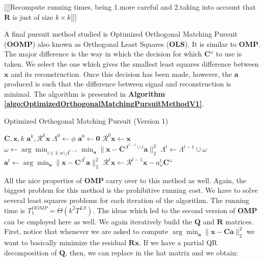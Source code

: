 \documentclass[12pt,a4paper,oneside,english]{UPBThesis}
\newcommand{\hctimes}[2]{{#1}\!\times\!{#2}}
\newcommand{\hcrange}[2]{\overline{{#1}\colon\!\!{#2}}}
\begin{document}
[[[Recompute running times, being 1.more careful and 2.taking into account that $\textbf{R}$ is just of size $\hctimes{k}{k}$]]]

A final pursuit method studied is Optimized Orthogonal Matching Pursuit (\textbf{OOMP}) also known as Orthogonal Least Squares (\textbf{OLS}). It is similar to \textbf{OMP}. The major difference is the way in which the decision for which $\textbf{C}^\omega$ to use is taken. We select the one which gives the smallest least squares difference between $\textbf{x}$ and its reconstruction. Once this decision has been made, however, the $\textbf{a}$ produced is such that the difference between signal and reconstruction is minimal. The algorithm is presented in \textbf{Algorithm \ref{algo:OptimizedOrthogonalMatchingPursuitMethodV1}}.

\begin{algorithm}
\caption{Optimized Orthogonal Matching Pursuit (Version 1)}
\label{algo:OptimizedOrthogonalMatchingPursuitMethodV1}
\begin{algorithmic}
\Require $\textbf{C},\textbf{x},k$
\Ensure $\textbf{a}^k,\mathcal{R}^k\textbf{x}$
\State $\Lambda^0 \gets \phi$
\State $\textbf{a}^0 \gets \textbf{0}$
\State $\mathcal{R}^0\textbf{x} \gets \textbf{x}$
\For {$t = \hcrange{1}{k}$}
\State $\omega \gets \arg \min_{i \in \hcrange{1}{w} \setminus \Lambda^{t-1}} \min_{\textbf{a}} {\| \textbf{x} - \textbf{C}^{\Lambda^{t-1} \cup i}\textbf{a} \|_2^2}$
\State $\Lambda^t \gets \Lambda^{t-1} \cup \omega$
\State $\textbf{a}^t \gets \arg\min_{\textbf{a}} {\| \textbf{x} - \textbf{C}^{\Lambda^t}\textbf{a} \|_2^2}$
\State $\mathcal{R}^t\textbf{x} \gets \mathcal{R}^{t-1}\textbf{x} - a_\omega^t\textbf{C}^\omega$
\EndFor
\end{algorithmic}
\end{algorithm}

All the nice properties of \textbf{OMP} carry over to this method as well. Again, the biggest problem for this method is the prohibitive running cost. We have to solve several least squares problems for each iteration of the algorithm. The running time is $T_1^{OOMP} = \Theta(k^2T^{LS})$. The ideas which led to the second version of \textbf{OMP} can be employed here as well. We again iteratively build the $\textbf{Q}$ and $\textbf{R}$ matrices. First, notice that whenever we are asked to compute $\arg\min_\textbf{a} \| \textbf{x} - \textbf{C}\textbf{a} \|_2^2$ we want to basically minimize the residual $\textbf{R}\textbf{x}$. If we have a partial QR decomposition of $\textbf{Q}$, then, we can replace in the hat matrix and we obtain:
\end{document}

